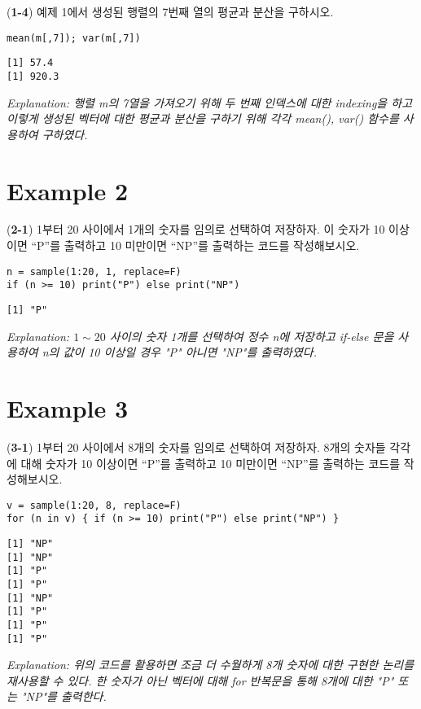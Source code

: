 \documentclass{article}
\begin{document}
(\textbf{1-4}) 예제 1에서 생성된 행렬의 7번째 열의 평균과 분산을 구하시오.
\begin{lstlisting}[style={r-style}]
mean(m[,7]); var(m[,7])
\end{lstlisting}
\begin{lstlisting}[style={out-style}]
[1] 57.4
[1] 920.3
\end{lstlisting}
\emph{Explanation: 행렬 m의 7열을 가져오기 위해 두 번째 인덱스에 대한 indexing을 하고 이렇게 생성된 벡터에 대한 평균과 분산을 구하기 위해 각각 mean(), var() 함수를 사용하여 구하였다.} \\

\section*{Example 2}
(\textbf{2-1}) 1부터 20 사이에서 1개의 숫자를 임의로 선택하여 저장하자. 이 숫자가 10 이상이면
“P”를 출력하고 10 미만이면 “NP”를 출력하는 코드를 작성해보시오.
\begin{lstlisting}[style={r-style}]
n = sample(1:20, 1, replace=F)
if (n >= 10) print("P") else print("NP")
\end{lstlisting}
\begin{lstlisting}[style={out-style}]
[1] "P"
\end{lstlisting}
\emph{Explanation: $1\sim20$ 사이의 숫자 1개를 선택하여 정수 n에 저장하고 if-else 문을 사용하여 n의 값이 10 이상일 경우 "P" 아니면 "NP"를 출력하였다.} \\

\section*{Example 3}
(\textbf{3-1}) 1부터 20 사이에서 8개의 숫자를 임의로 선택하여 저장하자. 8개의 숫자들 각각에
대해 숫자가 10 이상이면 “P”를 출력하고 10 미만이면 “NP”를 출력하는 코드를 작성해보시오.
\begin{lstlisting}[style={r-style}]
v = sample(1:20, 8, replace=F)
for (n in v) { if (n >= 10) print("P") else print("NP") }
\end{lstlisting}
\begin{lstlisting}[style={out-style}]
[1] "NP"
[1] "NP"
[1] "P"
[1] "P"
[1] "NP"
[1] "P"
[1] "P"
[1] "P"
\end{lstlisting}
\emph{Explanation: 위의 코드를 활용하면 조금 더 수월하게 8개 숫자에 대한 구현한 논리를 재사용할 수 있다. 한 숫자가 아닌 벡터에 대해 for 반복문을 통해 8개에 대한 "P" 또는 "NP"를 출력한다.} \\
\end{document}
